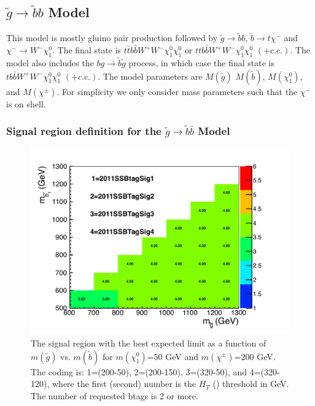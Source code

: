 \clearpage

\subsection{$\widetilde{g} \to \widetilde{b}b$ Model}
\label{sec:gbb}
This model is mostly gluino pair production followed by 
$\widetilde{g} \to \widetilde{b}b$, $\widetilde{b} \to t \chi^{-}$ and
$\chi^{-} \to W^- \chi_1^0$. 
The final state is $t\bar{t}b\bar{b}W^+W^- \chi_1^0 \chi_1^0$
or $ttb\bar{b}W^+W^- \chi_1^0 \chi_1^0$ $(+ c.c.)$.
The model also includes the $b g \to \widetilde{b} \widetilde{g}$ process,
in which case the final state is
$tb\bar{b}W^+W^- \chi_1^0 \chi_1^0$ $(+ c.c.)$. 
The model parameters are $M(\widetilde{g})$
$M(\widetilde{b})$, $M(\chi_1^0)$, and $M(\chi^{\pm})$.
For simplicity we only consider mass parameters such that the $\chi^{-}$ is on shell.

\subsubsection{Signal region definition for the $\widetilde{g} \to \widetilde{b}\bar{b}$ Model}
\label{sec:gbbdefinition}

\begin{figure}[htb]
\begin{center}
\includegraphics[width=0.65\linewidth]{figs/gl_sb_300_50_regions.pdf}
\caption{The signal region with the best expected limit as a function of 
$m(\widetilde{g})$ vs. $m(\widetilde{b})$ for $m(\chi^0_1)$=50 GeV
and $m(\chi^{\pm})$=200 GeV. 
The coding is: 1=(200-50), 2=(200-150), 3=(320-50), and 4=(320-120), where
the first (second) number is the $H_T$ (\met) threshold in GeV. The number
of requested btags is 2 or more.
\label{fig:gluinosboptimize}}
\end{center}
\end{figure}


